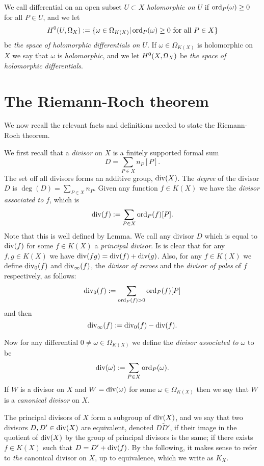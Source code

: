We call differential on an open subset $U \subset X$ \emph{holomorphic on $U$} if $\operatorname{ord}_P(\omega) \geq 0$ for all $P \in U$, and we let
    \[
    H^0(U, \Omega_X) := \{ \omega \in \Omega_{K(X)} | \operatorname{ord}_P(\omega) \geq 0\ \text{for all}\ P \in X\}
    \]
be \emph{the space of holomorphic differentials on $U$}.
If $\omega \in \Omega_{K(X)}$ is holomorphic on $X$ we say that $\omega$ is \emph{holomorphic}, and we let ${H^0(X,\Omega_X)}$ be \emph{the space of holomorphic differentials}.

\section{The Riemann-Roch theorem}

We now recall the relevant facts and definitions needed to state the Riemann-Roch theorem.

We first recall that a \emph{divisor} on $X$ is a finitely supported formal sum 
    \[
    D = \sum_{P \in X} n_P[P].
    \]
The set off all divisors forms an additive group, $\operatorname{div} (X)$.
The \emph{degree} of the divisor $D$ is $\deg(D) = \sum_{P \in X} n_P$.
Given any function $f \in K(X)$ we have the \emph{divisor associated to $f$}, which is
    \[
    \operatorname{div}(f) := \sum_{P \in X} \operatorname{ord}_P(f) [P].
    \]
Note that this is well defined by Lemma. 
We call any divisor $D$ which is equal to $\operatorname{div}(f)$ for some $f \in K(X)$ a \emph{principal divisor}.
Is is clear that for any $f, g \in K(X)$ we have $\operatorname{div}(fg) = \operatorname{div}(f) + \operatorname{div}(g)$.
Also, for any $f \in K(X)$ we define $\operatorname{div}_0(f)$ and $\operatorname{div}_\infty (f)$, the \emph{divisor of zeroes} and the \emph{divisor of poles} of $f$ respectively, as follows:
    \[
    \operatorname{div}_0(f) := \sum_{\operatorname{ord}_P(f) >0} \operatorname{ord}_P(f)[P]
    \]
and then
    \[
    \operatorname{div}_\infty(f) := \operatorname{div}_0(f) - \operatorname{div}(f).
    \]

Now for any differential $0 \neq \omega \in \Omega_{K(X)}$ we define the \emph{divisor associated to $\omega$} to be
    \[
    \operatorname{div}(\omega) := \sum_{P \in X} \operatorname{ord}_P(\omega).
    \]
If $W$ is a divisor on $X$ and $W = \operatorname{div}(\omega)$ for some $ \omega \in \Omega_{K(X)}$ then we say that $W$ is a \emph{canonical divisor} on $X$.

The principal divisors of $X$ form a subgroup of $\operatorname{div}(X)$, and we say that two divisors $D, D' \in \operatorname{div}(X)$ are equivalent, denoted $D \tilde D'$, if their image in the quotient of $\operatorname{div}(X)$ by the group of principal divisors is the same; \ie if there exists $f \in K(X)$ such that $ D = D' + \operatorname{div}(f)$.
By the following, it makes sense to refer to \emph{the} canonical divisor on $X$, up to equivalence, which we write as $K_X$.


